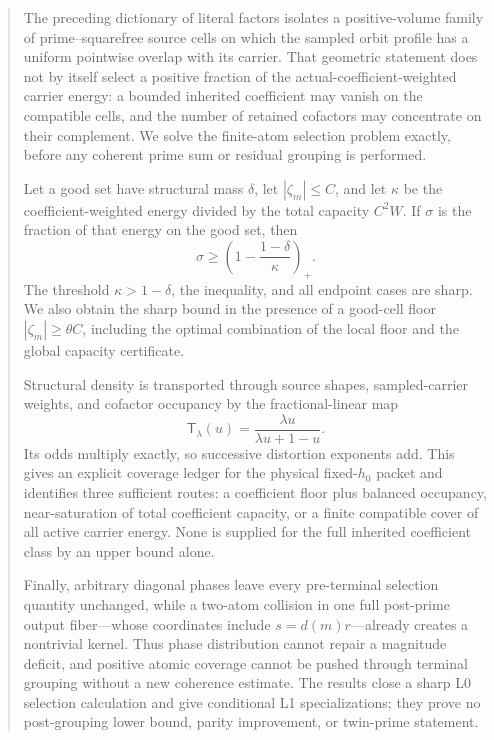 \begin{abstract}
The preceding dictionary of literal factors isolates a positive-volume family
of prime--squarefree source cells on which the sampled orbit profile has a
uniform pointwise overlap with its carrier.  That geometric statement does
not by itself select a positive fraction of the
actual-coefficient-weighted carrier energy: a
bounded inherited coefficient may vanish on the compatible cells, and the
number of retained cofactors may concentrate on their complement.  We
solve the finite-atom selection problem exactly, before any coherent prime
sum or residual grouping is performed.

Let a good set have structural mass \(\delta\), let
\(|\zeta_m|\le C\), and let \(\kappa\) be the coefficient-weighted energy
divided by the total capacity \(C^2W\).  If \(\sigma\) is the fraction of
that energy on the good set, then
\[
 \sigma\ge
 \left(1-\frac{1-\delta}{\kappa}\right)_+.
\]
The threshold \(\kappa>1-\delta\), the inequality, and all endpoint cases
are sharp.  We also obtain the sharp bound in the presence of a good-cell
floor \(|\zeta_m|\ge\theta C\), including the optimal combination of the
local floor and the global capacity certificate.

Structural density is transported through source shapes, sampled-carrier
weights, and cofactor occupancy by the fractional-linear map
\[
 \mathsf T_\lambda(u)=\frac{\lambda u}{\lambda u+1-u}.
\]
Its odds multiply exactly, so successive distortion exponents add.  This
gives an explicit coverage ledger for the physical fixed-\(h_0\) packet
and identifies three sufficient routes: a coefficient floor plus balanced
occupancy, near-saturation of total coefficient capacity, or a finite
compatible cover of all active carrier energy.  None is supplied for the
full inherited coefficient class by an upper bound alone.

Finally, arbitrary diagonal phases leave every pre-terminal selection
quantity unchanged, while a two-atom collision in one full post-prime
output fiber---whose coordinates include \(s=d(m)r\)---already creates a
nontrivial kernel.  Thus phase distribution
cannot repair a magnitude deficit, and positive atomic coverage cannot be
pushed through terminal grouping without a new coherence estimate.  The
results close a sharp L0 selection calculation and give conditional L1
specializations; they prove no post-grouping lower bound, parity
improvement, or twin-prime statement.
\end{abstract}
